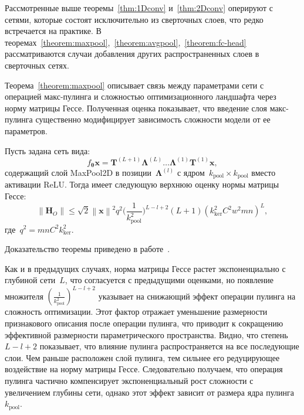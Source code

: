 Рассмотренные выше теоремы~\ref{thm:1Dconv} и~\ref{thm:2Dconv} оперируют с сетями, которые состоят исключительно из сверточных слоев, что редко встречается на практике. В теоремах~\ref{theorem:maxpool},~\ref{theorem:avgpool},~\ref{theorem:fc-head} рассматриваются случаи добавления других распространенных слоев в сверточных сетях.

Теорема~\ref{theorem:maxpool} описывает связь между параметрами сети с операцией макс-пулинга и сложностью оптимизационного ландшафта через норму матрицы Гессе. Полученная оценка показывает, что введение слоя макс-пулинга существенно модифицирует зависимость сложности модели от ее параметров.

\begin{theorem}\label{theorem:maxpool}
    Пусть задана сеть вида: 
    \[
        f_{\boldsymbol{\theta}}{\mathbf{x}} = \mathbf{T}^{(L+1)}\boldsymbol{\Lambda}^{(L)}\dots \boldsymbol{\Lambda}^{(1)}\mathbf{T}^{(1)}\mathbf{x},
    \]
    содержащий слой MaxPool2D в позиции~$\boldsymbol{\Lambda}^{(l)}$ с ядром~$k_{\mathrm{pool}} \times k_{\mathrm{pool}}$ вместо активации ReLU.
    Тогда имеет следующую верхнюю оценку нормы матрицы Гессе:
    \[
        \left\|\mathbf{H}_O\right\| \leqslant \sqrt{2}\left\|\mathbf{x}\right\|^2q^2\big(\frac{1}{k_{\mathrm{pool}}^2}\big)^{L-l+2}(L+1)(k_{\mathrm{ker}}^2C^2w^2mn)^{L},
    \]
    где~$q^2 = mnC^2k_{\mathrm{ker}}^2$.
\end{theorem}
Доказательство теоремы приведено в работе~\cite{grabovoi2024convnets743111032}.

\begin{remark}
    Как и в предыдущих случаях, норма матрицы Гессе растет экспоненциально с глубиной сети~$L$, что согласуется с предыдущими оценками, но появление множителя $\left(\frac{1}{k_{\mathrm{pool}}^2}\right)^{L-l+2}$ указывает на снижающий эффект операции пулинга на сложность оптимизации.
    Этот фактор отражает уменьшение размерности признакового описания после операции пулинга, что приводит к сокращению эффективной размерности параметрического пространства.
    Видно, что степень $L-l+2$ показывает, что влияние пулинга распространяется на все последующие слои.
    Чем раньше расположен слой пулинга, тем сильнее его редуцирующее воздействие на норму матрицы Гессе.
    Следовательно получаем, что операция пулинга частично компенсирует экспоненциальный рост сложности с увеличением глубины сети, однако этот эффект зависит от размера ядра пулинга~$k_{\mathrm{pool}}$.
\end{remark}

